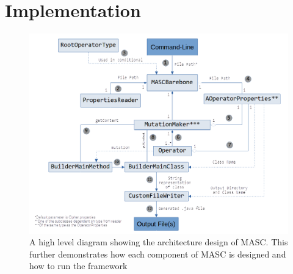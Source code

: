 \chapter{Implementation}
\label{chap_implementation}

\begin{figure}[!ht]
	\centering
    \includegraphics[width=0.96\linewidth]{figures/architecture.png}
	\vspace{-1.em}
    \caption{\small A high level diagram showing the architecture design of MASC. This further demonstrates how each component of MASC is designed and how to run the framework}
    \label{fig:taxonomy}
	
\end{figure}

